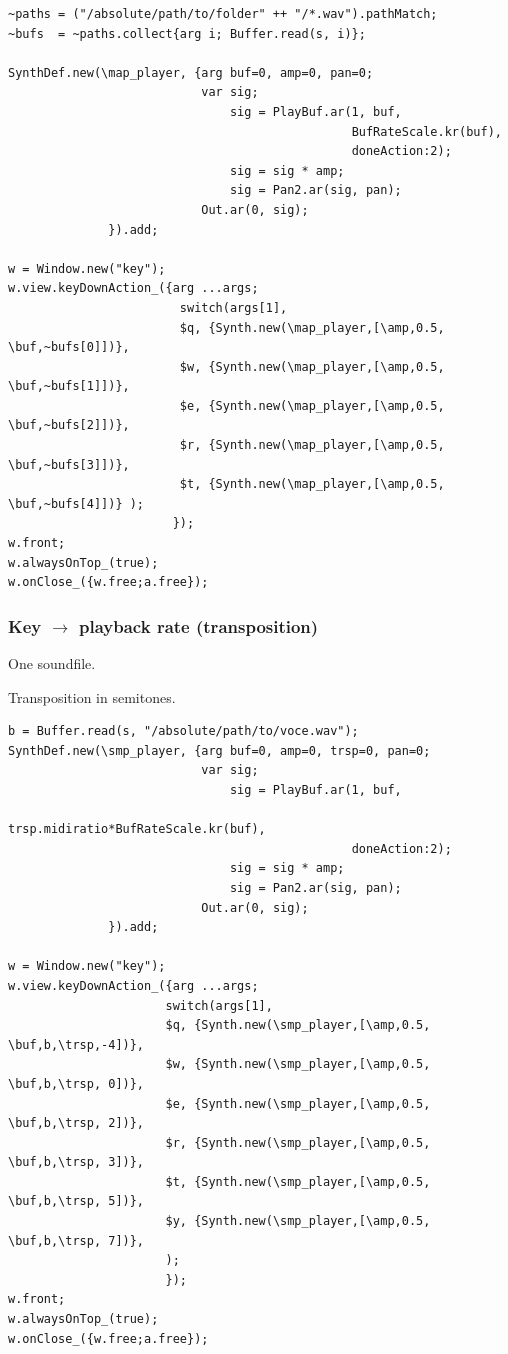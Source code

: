 \begin{lstlisting}[frame=single, caption=playback key-map-soundfile model] 
~paths = ("/absolute/path/to/folder" ++ "/*.wav").pathMatch;
~bufs  = ~paths.collect{arg i; Buffer.read(s, i)};

SynthDef.new(\map_player, {arg buf=0, amp=0, pan=0;
                           var sig;
                               sig = PlayBuf.ar(1, buf, 
                                                BufRateScale.kr(buf), 
                                                doneAction:2);
                               sig = sig * amp;
                               sig = Pan2.ar(sig, pan); 
                           Out.ar(0, sig);
              }).add;

w = Window.new("key");
w.view.keyDownAction_({arg ...args;
	                    switch(args[1],
	                    $q, {Synth.new(\map_player,[\amp,0.5, \buf,~bufs[0]])},
	                    $w, {Synth.new(\map_player,[\amp,0.5, \buf,~bufs[1]])},
	                    $e, {Synth.new(\map_player,[\amp,0.5, \buf,~bufs[2]])},
	                    $r, {Synth.new(\map_player,[\amp,0.5, \buf,~bufs[3]])},
	                    $t, {Synth.new(\map_player,[\amp,0.5, \buf,~bufs[4]])} );
                       });
w.front;
w.alwaysOnTop_(true);
w.onClose_({w.free;a.free});
\end{lstlisting} 

\subsubsection{Key \(\rightarrow\) playback rate (transposition) }\label{key-rate}

One soundfile.

Transposition in semitones.

\begin{lstlisting}[frame=single, caption=playback key-playback-rate model] 
b = Buffer.read(s, "/absolute/path/to/voce.wav");
SynthDef.new(\smp_player, {arg buf=0, amp=0, trsp=0, pan=0;
                           var sig;
                               sig = PlayBuf.ar(1, buf,
                                                trsp.midiratio*BufRateScale.kr(buf), 
                                                doneAction:2);
                               sig = sig * amp;
                               sig = Pan2.ar(sig, pan);
                           Out.ar(0, sig);
              }).add;

w = Window.new("key");
w.view.keyDownAction_({arg ...args;
                      switch(args[1],
                      $q, {Synth.new(\smp_player,[\amp,0.5, \buf,b,\trsp,-4])},
                      $w, {Synth.new(\smp_player,[\amp,0.5, \buf,b,\trsp, 0])},
                      $e, {Synth.new(\smp_player,[\amp,0.5, \buf,b,\trsp, 2])},
                      $r, {Synth.new(\smp_player,[\amp,0.5, \buf,b,\trsp, 3])},
                      $t, {Synth.new(\smp_player,[\amp,0.5, \buf,b,\trsp, 5])},
                      $y, {Synth.new(\smp_player,[\amp,0.5, \buf,b,\trsp, 7])},                            
                      );
                      });
w.front;
w.alwaysOnTop_(true);
w.onClose_({w.free;a.free});
\end{lstlisting} 

